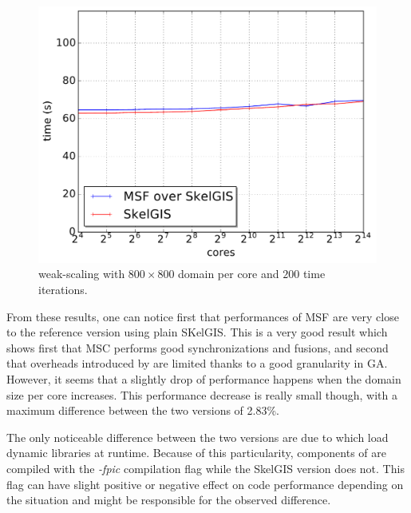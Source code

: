 \begin{figure}[t]
\begin{center}
  \includegraphics[width=.6\textwidth]{../results/weak_scaling/800_200/median_weak.pdf}
  \caption{weak-scaling with $800 \times 800$ domain per core and $200$ time iterations.}
  \label{fig:weak3}
 \end{center}
\end{figure}

From these results, one can notice first that performances of MSF are very close to the reference version using plain SKelGIS. This is a very good result which shows first that MSC performs good synchronizations and fusions, and second that overheads introduced by \llc are limited thanks to a good granularity in GA.
However, it seems that a slightly drop of performance happens when the domain size per core increases. This performance decrease is really small though, with a maximum difference between the two versions of 2.83\%.

The only noticeable difference between the two versions are due to \llc which load dynamic libraries at runtime. Because of this particularity, components of \llc are compiled with the \emph{-fpic} compilation flag while the SkelGIS version does not. This flag can have slight positive or negative effect on code performance depending on the situation and might be responsible for the observed difference.


